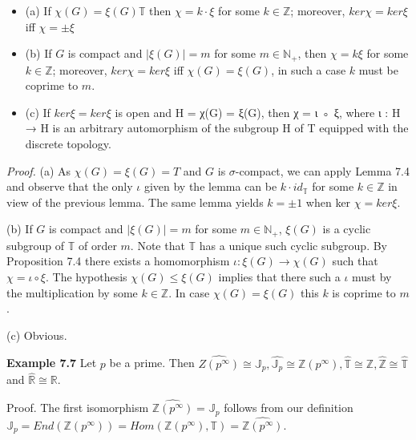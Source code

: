 \documentclass[12pt]{article}
\begin{document}
\begin{itemize}
\begin{itemize}
\begin{itemize}

    \item (a) If $\chi(G) = \xi(G) \mathbb{T}$ then $\chi = k · \xi$ for some $k \in \mathbb{Z}$; moreover, $ker \chi = ker \xi$ iff $\chi = \pm \xi$

    \item (b) If $G$ is compact and $|\xi (G)| = m$ for some $m \in \mathbb{N}_+$, then $\chi = k \xi$ for some $k \in \mathbb{Z}$; moreover, $ker \chi = ker \xi$
    iff $\chi(G) = \xi(G)$, in such a case $k$ must be coprime to $m$.

    \item (c) If $ker \xi = ker \xi$ is open and H = χ(G) = ξ(G), then χ = ι ◦ ξ, where ι : H → H is an arbitrary
    automorphism of the subgroup H of T equipped with the discrete topology.    

\end{itemize}


\emph{Proof.} (a) As $\chi (G) = \xi (G) = T$ and $G$ is $\sigma$-compact, we can apply Lemma 7.4 and observe that the only $\iota$ given
by the lemma can be $k · id_{\mathbb{T}}$ for some $k \in \mathbb{Z}$ in view of the previous lemma. The same lemma yields $k = \pm 1$
when ker $\chi = ker \xi$.


    (b) If $G$ is compact and $|\xi (G)| = m$ for some $m \in \mathbb{N}_+$, $\xi (G)$ is a cyclic subgroup of $\mathbb{T}$ of order $m$. Note that
$\mathbb{T}$ has a unique such cyclic subgroup. By Proposition 7.4 there exists a homomorphism $\iota : \xi (G) \to \chi (G)$ such
that $\chi = \iota \circ \xi$. The hypothesis $\chi (G) \leq \xi (G)$ implies that there such a $\iota$ must by the multiplication by some
$k \in \mathbb{Z}$. In case $\chi (G) = \xi (G)$ this $k$ is coprime to $m$.


    (c) Obvious.


\textbf{Example 7.7} Let $p$ be a prime. Then $\hat{Z(p^{\infty})} \cong \mathbb{J}_p, \hat{\mathbb{J}_p} \cong \mathbb{Z}(p^{\infty}), \hat{\mathbb{T}} \cong \mathbb{Z}, \hat{\mathbb{Z}} \cong \hat{\mathbb{T}}$ and $\hat{\mathbb{R}} \cong \mathbb{R}$.


Proof. The first isomorphism $\hat{\mathbb{Z}(p^{\infty})} = \mathbb{J}_p$ follows from our definition $\mathbb{J}_p = End(\mathbb{Z}(p^{\infty})) = Hom(\mathbb{Z}(p^{\infty}),\mathbb{T}) = \hat{\mathbb{Z}(p^{\infty})}$.



\end{itemize}
\end{itemize}
\end{document}
